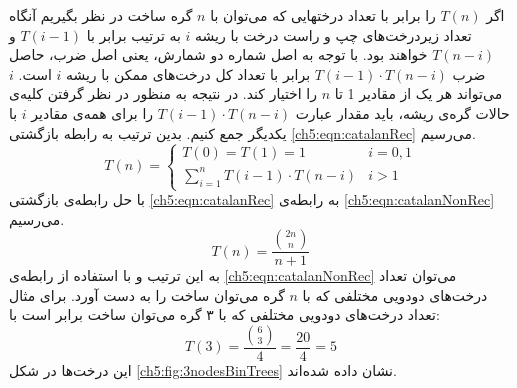  اگر {$T(n)$} را برابر با تعداد درختهایی که می‌توان با {$n$} گره ساخت در نظر بگیریم آنگاه تعداد زیردرخت‌های چپ و راست درخت با ریشه {$i$} به ترتیب برابر با {$T(i-1)$} و {$T(n-i)$} خواهند بود. با توجه به اصل شماره دو شمارش، یعنی اصل ضرب، حاصل ضرب {$T(i-1)\cdot T(n-i)$} برابر با تعداد کل درخت‌های ممکن با ریشه {$i$} است. {$i$} می‌تواند هر یک از مقادیر 1 تا {$n$} را اختیار کند. در نتیجه به ‌منظور در نظر گرفتن کلیه‌ی حالات گره‌ی ریشه، باید  مقدار عبارت {$T(i-1)\cdot T(n-i)$} را برای همه‌ی مقادیر {$i$} با یکدیگر جمع کنیم. بدین ترتیب به رابطه بازگشتی {\ref{ch5:eqn:catalanRec}} می‌رسیم.
 \begin{equation}
 T(n)=
 \begin{cases}
 T(0)=T(1)=1 & i=0,1\\
 \sum\limits_{i=1}^{n}{T(i-1)\cdot T(n-i)}& i > 1
 \end{cases}\label{ch5:eqn:catalanRec}
 \end{equation}
با حل رابطه‌ی بازگشتی {\ref{ch5:eqn:catalanRec}} به رابطه‌ی  {\ref{ch5:eqn:catalanNonRec}} می‌رسیم.
 \begin{equation}
T(n)=\frac{\displaystyle\binom{2n}{n}}{n+1}\label{ch5:eqn:catalanNonRec}
 \end{equation}
به این ترتیب و با استفاده از رابطه‌ی {\ref{ch5:eqn:catalanNonRec}} می‌توان تعداد درخت‌های دودویی مختلفی که با {$n$} گره می‌توان ساخت را به دست آورد. برای مثال تعداد درخت‌های دودویی مختلفی که با ۳ گره می‌توان ساخت برابر است با:
\begin{displaymath}
T(3)=\frac{\displaystyle\binom{6}{3}}{4}=\frac{20}{4}=5
\end{displaymath}
این درخت‌ها در شکل {\ref{ch5:fig:3nodesBinTrees}} نشان داده شده‌اند.

